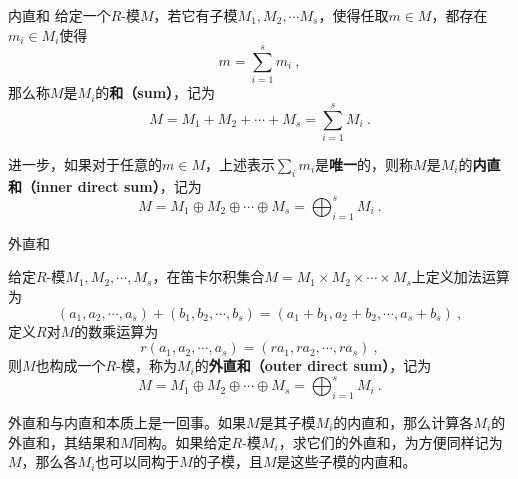 





\begin{definition}{内直和}
给定一个$R$-模$M$，若它有子模$M_1, M_2, \cdots M_s$，使得任取$m\in M$，都存在$m_i\in M_i$使得
\begin{equation}
m = \sum_{i=1}^{s} m_i~, 
\end{equation}
那么称$M$是$M_i$的\textbf{和（sum）}，记为
\begin{equation}
M=M_1+M_2+\cdots+M_s=\sum_{i=1}^s M_i~.
\end{equation}

进一步，如果对于任意的$m\in M$，上述表示$\sum_i m_i$是\textbf{唯一}的，则称$M$是$M_i$的\textbf{内直和（inner direct sum）}，记为
\begin{equation}
M=M_1\oplus M_2\oplus \cdots \oplus M_s= \bigoplus_{i=1}^s M_i~.
\end{equation}
\end{definition}


\begin{definition}{外直和}

给定$R$-模$M_1, M_2, \cdots, M_s$，在笛卡尔积集合$M=M_1\times M_2\times \cdots \times M_s$上定义加法运算为
\begin{equation}
(a_1, a_2, \cdots, a_s)+(b_1, b_2, \cdots, b_s) = (a_1+b_1, a_2+b_2, \cdots, a_s+b_s)~, 
\end{equation}
定义$R$对$M$的数乘运算为
\begin{equation}
r(a_1, a_2, \cdots, a_s) = (ra_1, ra_2, \cdots, ra_s)~, 
\end{equation}
则$M$也构成一个$R$-模，称为$M_i$的\textbf{外直和（outer direct sum）}，记为
\begin{equation}
M=M_1\oplus M_2\oplus \cdots \oplus M_s= \bigoplus_{i=1}^s M_i~.
\end{equation}

\end{definition}




外直和与内直和本质上是一回事。如果$M$是其子模$M_i$的内直和，那么计算各$M_i$的外直和，其结果和$M$同构。如果给定$R$-模$M_i$，求它们的外直和，为方便同样记为$M$，那么各$M_i$也可以同构于$M$的子模，且$M$是这些子模的内直和。












